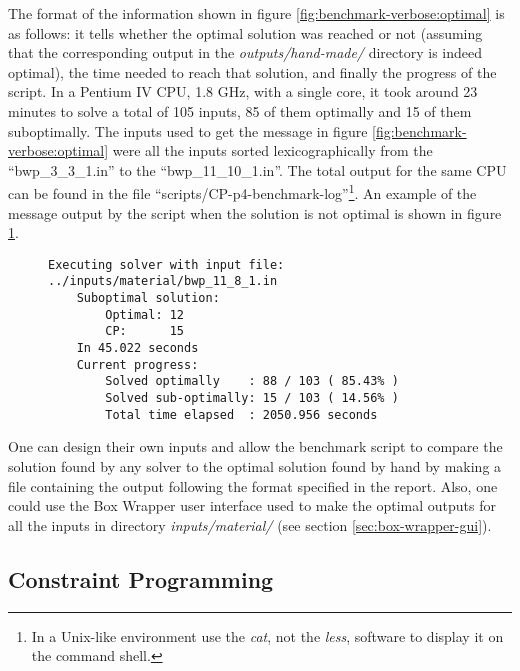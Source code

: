 The format of the information shown in figure \ref{fig:benchmark-verbose:optimal}
is as follows: it tells whether the optimal solution was reached or not (assuming
that the corresponding output in the \textit{outputs/hand-made/} directory is indeed
optimal), the time needed to reach that solution, and finally the progress of the
script. In a Pentium IV CPU, 1.8 GHz, with a single core, it took around 23 minutes
to solve a total of 105 inputs, 85 of them optimally and 15 of them suboptimally.
The inputs used to get the message in figure \ref{fig:benchmark-verbose:optimal} were
all the inputs sorted lexicographically from the ``bwp\_3\_3\_1.in'' to the
``bwp\_11\_10\_1.in''. The total output for the same CPU can be found
in the file ``scripts/CP-p4-benchmark-log''\footnote{ In a Unix-like environment use
the \textit{cat}, not the \textit{less}, software to display it on the command shell.}.
An example of the message output by the script when the solution is not optimal is
shown in figure \ref{fig:benchmark-verbose:suboptimal}.

\begin{figure}[H]
\centering
\begin{BVerbatim}
Executing solver with input file: ../inputs/material/bwp_11_8_1.in
    Suboptimal solution:
        Optimal: 12
        CP:      15
    In 45.022 seconds
    Current progress:
        Solved optimally    : 88 / 103 ( 85.43%
        Solved sub-optimally: 15 / 103 ( 14.56%
        Total time elapsed  : 2050.956 seconds
\end{BVerbatim}
\label{fig:benchmark-verbose:suboptimal}
\end{figure}

\hfill

One can design their own inputs and allow the benchmark script to compare
the solution found by any solver to the optimal solution found by hand by
making a file containing the output following the format specified in the
report. Also, one could use the Box Wrapper user interface used to make the
optimal outputs for all the inputs in directory \textit{inputs/material/}
(see section \ref{sec:box-wrapper-gui}).

\subsection{Constraint Programming}
\label{sec:benchmarking:constraint-programming}

